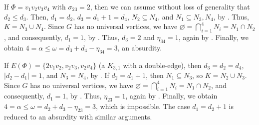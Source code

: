 \documentclass[11pt]{article}
\begin{document}
If $\Phi = v_1v_2v_3v_4$ with $\sigma_{23} = 2$, then we can assume without loss of generality that $d_2 \leq d_3$. Then, $d_1 = d_2$, $d_3 = d_1 + 1 = d_4$, $N_2 \subseteq N_4$, and $N_1 \subseteq N_3, N_4$, by  . Thus, $K = N_3 \cup N_4$. Since $G$ has no universal vertices, we have $\varnothing = \bigcap_{i=1}^4 N_i = N_1 \cap N_2$, and consequently, $d_1 = 1$, by  . Thus, $d_3 = 2$ and $\eta_{34} = 1$, again by  . Finally, we obtain $4 = \alpha \leq \omega = d_3 + d_4 - \eta_{34} = 3$, an absurdity.

If $E(\Phi) = \{2v_1v_2, v_2v_3, v_2v_4\}$ (a $K_{3,1}$ with a double-edge), then $d_3 = d_2 = d_4$, $|d_2 - d_1| = 1$, and $N_3 = N_4$, by  . If $d_2 = d_1 + 1$, then $N_1 \subseteq N_3$, so $K = N_2 \cup N_3$. Since $G$ has no universal vertices, we have $\varnothing = \bigcap_{i=1}^4 N_i = N_1 \cap N_2$, and consequently, $d_1 = 1$, by  . Thus, $\eta_{23} = 1$, again by  . Finally, we obtain $4 = \alpha \leq \omega = d_2 + d_3 - \eta_{23} = 3$, which is impossible. The case $d_1 = d_2 + 1$ is reduced to an absurdity with similar arguments.
\end{document}
